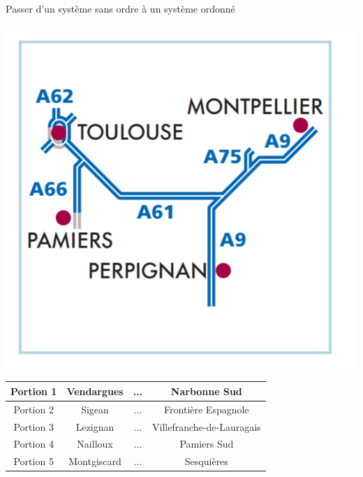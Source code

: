 \documentclass[aspectratio=169]{beamer}
\begin{document}
\begin{frame}{Passer d'un système sans ordre à un système ordonné}

\begin{center}

    \includegraphics[scale=0.4]{Carte.png}
    \begin{tabular}{*{4}{|c|}}
   \hline
   Portion 1 & Vendargues & ... & Narbonne Sud \\
  \hline
    Portion 2 & Sigean & ... & Frontière Espagnole \\
  \hline
  Portion 3 & Lezignan & ... & Villefranche-de-Lauragais \\
  \hline
  Portion 4 & Nailloux & ... & Pamiers Sud\\
  \hline
  Portion 5 & Montgiscard & ... & Sesquières \\
  \hline
\end{tabular}
\end{center}



\end{frame}
\end{document}
